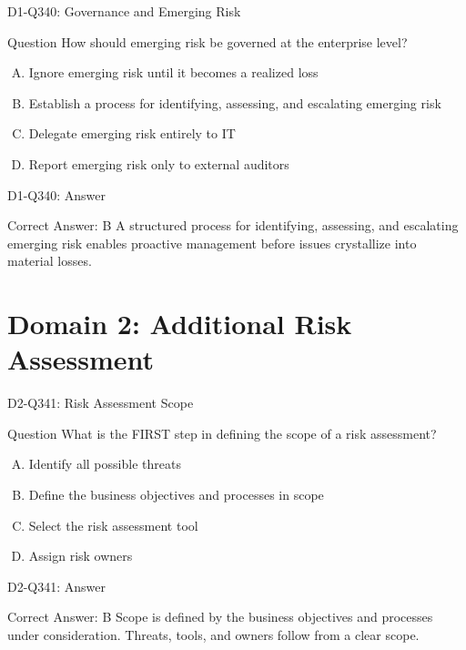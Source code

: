 \documentclass{beamer}
\begin{document}
\begin{frame}{D1-Q340: Governance and Emerging Risk}
	\begin{block}{Question}
		How should emerging risk be governed at the enterprise level?
	\end{block}
	\begin{enumerate}[(A)]
		\item Ignore emerging risk until it becomes a realized loss
		\item Establish a process for identifying, assessing, and escalating emerging risk
		\item Delegate emerging risk entirely to IT
		\item Report emerging risk only to external auditors
	\end{enumerate}
\end{frame}
\begin{frame}{D1-Q340: Answer}
	\begin{block}{Correct Answer: B}
		A structured process for identifying, assessing, and escalating emerging risk enables proactive management before issues crystallize into material losses.
	\end{block}
\end{frame}

\section{Domain 2: Additional Risk Assessment}

\begin{frame}{D2-Q341: Risk Assessment Scope}
	\begin{block}{Question}
		What is the FIRST step in defining the scope of a risk assessment?
	\end{block}
	\begin{enumerate}[(A)]
		\item Identify all possible threats
		\item Define the business objectives and processes in scope
		\item Select the risk assessment tool
		\item Assign risk owners
	\end{enumerate}
\end{frame}
\begin{frame}{D2-Q341: Answer}
	\begin{block}{Correct Answer: B}
		Scope is defined by the business objectives and processes under consideration. Threats, tools, and owners follow from a clear scope.
	\end{block}
\end{frame}
\end{document}
